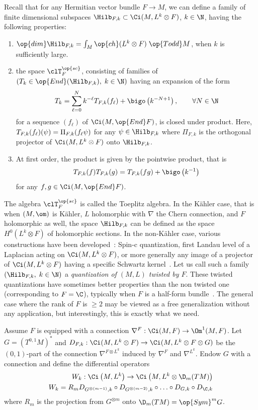 Recall that for any Hermitian vector bundle $F \rightarrow M $, we can define a family of finite dimensional subspaces $\Hilb_{F,k} \subset \Ci (M, L^k \otimes F)$, $k
\in \N$, having the following properties:
\begin{enumerate}
\item $\op{dim} \Hilb_{F,k} = \int_M \op{ch} (L^k \otimes F) \; \op{Todd} M$, when $k$ is sufficiently large.
\item the space $\clT_F^{\op{sc}}$, consisting of families of $(T_k \in \op{End} (\Hilb_{F,k}), \; k \in \N)$ having an expansion of the form
\[
T_k = \sum_{\ell = 0 }^N k^{-\ell} T_{F,k} (f_{\ell}) + \bigo \left(k^{-N+1}\right), \qquad
\forall N \in \N
\]
for a sequence $(f_\ell)$ of $\Ci (M, \op{End} F)$, is closed under product. Here, $T_{F,k} (f_{\ell}) (\psi)\linebreak = \Pi_{F,k} (f_{\ell} \psi)$ for any $\psi
\in \Hilb_{F,k} $ where $\Pi_{F,k}$ is the orthogonal projector of $\Ci (M, L^k
\otimes F)$ onto $\Hilb_{F,k}$.
\item At first order, the product is given by the pointwise product, that is 
\[
T_{F,k} (f) T_{F,k} (g) = T_{F,k} (fg) + \bigo \left(k^{-1}\right)
\]
for any $f,g \in \Ci (M,\op{End} F)$.
\end{enumerate}
The algebra $\clT_F^{\op{sc}}$ is called the Toeplitz algebra. In the K\"ahler case, that is when $(M, \om)$ is K\"ahler, $L$ holomorphic with $\nabla$ the Chern connection, and $F$ holomorphic as well, the space $\Hilb_{F,k}$ can be defined as the space $ H^0 (L^k \otimes F)$ of holomorphic sections. In the non-K\"ahler case, various constructions have been developed~\cite{BoUr96, MaMa}: Spin-c quantization, first Landau level of a Laplacian acting on $\Ci (M, L^k
\otimes F)$, or more generally any image of a projector of $\Ci (M, L^k
\otimes F)$ having a specific Schwartz kernel~\cite{oim}. Let us call such a family $(\Hilb_{F,k}, \; k \in \N)$ a {\em quantization of $(M,L)$ twisted by $F$}. These twisted quantizations have sometimes better properties than the non twisted one (corresponding to $F=\C$), typically when $F$ is a half-form bundle~\cite{oim_eq}. The general case where the rank of $F$ is $\geqslant 2$ may be viewed as a free generalization without any application, but interestingly, this is exactly what we need.

Assume $F$ is equipped with a connection $\nabla^F : \Ci (M, F) \rightarrow
\Om^1 (M, F)$. Let $G = (T^{0,1}M)^*$ and $D_{F,k} : \Ci (M, L^k \otimes F) \rightarrow \Ci (M, L^k
\otimes F \otimes G) $ be the $(0,1)$-part of the connection $\nabla^{F \otimes L^k}$ induced by $\nabla^F$ and $\nabla^{L^k}$. Endow $G$ with a connection and define the differential operators
\begin{gather}\label{eq:def_w_k}
\begin{split}
W_k : \Ci \left(M, L^k\right) \rightarrow \Ci \left(M, L^k \otimes \D_m (TM)\right)\\
W_k = R_m D_{G^{\otimes (m-1)},k} \circ D_{G^{\otimes (m-2)},k} \circ \ldots \circ D_{G, k} \circ D_{\C,k}
\end{split}
\end{gather}
where $R_m$ is the projection from $G^{\otimes m }$ onto $\D_m (TM) =
\op{Sym}^m G$.

